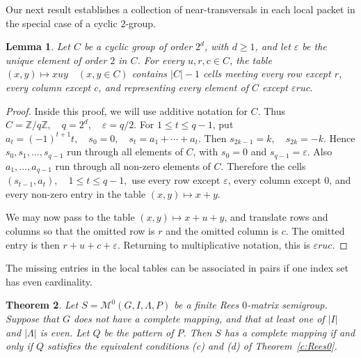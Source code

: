 \documentclass[11pt]{article}
\theoremstyle{plain}
\newtheorem{theorem}{Theorem}[section]
\newtheorem{lemma}[theorem]{Lemma}
\theoremstyle{remark}
\theoremstyle{definition}
\theoremstyle{plain}
\begin{document}
Our next result establishes a collection of near-transversals in each local packet in the special case of a cyclic $2$-group.

\begin{lemma}\label{l:cyclic2-near-transversal}
Let $C$ be a cyclic group of order $2^d$, with $d\ge 1$, and let
$\varepsilon$ be the unique element of order $2$ in $C$. For every
$u,r,c\in C$, the table
\((x,y)\longmapsto xuy \quad (x,y\in C)\)
contains $|C|-1$ cells meeting every row except $r$, every column except $c$, and representing every element of $C$ except
\(\varepsilon ruc.\)
\end{lemma}

\begin{proof}
Inside this proof, we will use additive notation for $C$. Thus
\(C=\mathbb Z/q\mathbb Z, \quad q=2^d, \quad \varepsilon=q/2.\)
For $1\le t\le q-1$, put
\(a_t=(-1)^{t+1}t, \quad s_0=0, \quad s_t=a_1+\cdots+a_t.\)
Then
\(s_{2k-1}=k, \quad s_{2k}=-k.\)
Hence
\(s_0,s_1,\ldots,s_{q-1}\)
run through all elements of $C$, with $s_0=0$ and $s_{q-1}=\varepsilon$.
Also $a_1,\ldots,a_{q-1}$ run through all non-zero elements of $C$. Therefore
the cells
\((s_{t-1},a_t), \quad 1\le t\le q-1,\)
use every row except $\varepsilon$, every column except $0$, and every non-zero entry
 in the table $(x,y)\mapsto x+y$.

We may now pass to the table $(x,y)\mapsto x+u+y$, and translate rows and columns so
that the omitted row is $r$ and the omitted column is $c$. The omitted entry
is then
\(r+u+c+\varepsilon.\)
Returning to multiplicative notation, this is
\(\varepsilon ruc.\)
\end{proof}

The missing entries in the local tables can be associated in pairs if one index set has even cardinality.

\begin{theorem}\label{t:Rees0-noncomp-even}
Let
\(S=\mathcal M^0(G,I,\Lambda,P)\)
be a finite Rees $0$-matrix semigroup. Suppose that $G$ does not have a
complete mapping, and that at least one of $|I|$ and $|\Lambda|$ is even. Let
$Q$ be the pattern of $P$. Then $S$ has a complete mapping if and only if
$Q$ satisfies the equivalent conditions \textup{(c)} and \textup{(d)} of
Theorem~\ref{c:Rees0}.
\end{theorem}
\end{document}
